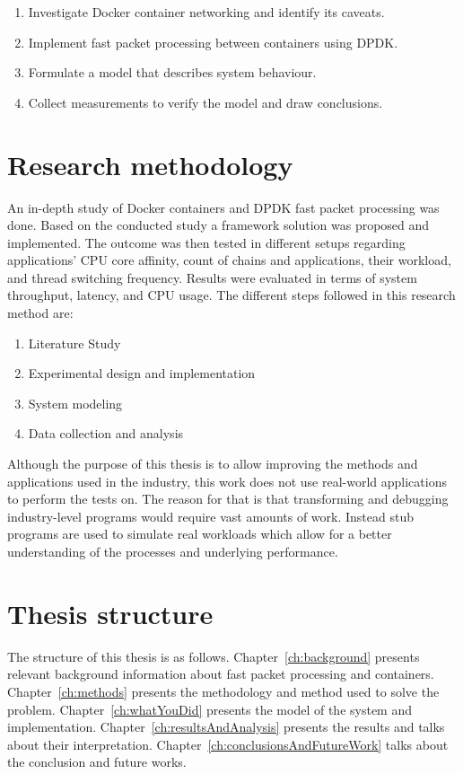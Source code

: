 \documentclass[english]{kththesis}
\begin{document}
\begin{enumerate}
\item Investigate Docker container networking and identify its caveats.
\item Implement fast packet processing between containers using \gls{DPDK}.
\item Formulate a model that describes system behaviour.
\item Collect measurements to verify the model and draw conclusions.
\end{enumerate}

\section{Research methodology}
An in-depth study of Docker containers and \gls{DPDK} fast packet processing was done. Based on the conducted study a framework solution was proposed and implemented. The outcome was then tested in different setups regarding applications' CPU core affinity, count of chains and applications, their workload, and thread switching frequency. Results were evaluated in terms of system throughput, latency, and CPU usage. The different steps followed in this research method are:
\begin{enumerate}
    \item Literature Study
    \item Experimental design and implementation
    \item System modeling
    \item Data collection and analysis
\end{enumerate}

Although the purpose of this thesis is to allow improving the methods and applications used in the industry, this work does not use real-world applications to perform the tests on. The reason for that is that transforming and debugging industry-level programs would require vast amounts of work. Instead stub programs are used to simulate real workloads which allow for a better understanding of the processes and underlying performance.

\section{Thesis structure}
The structure of this thesis is as follows. Chapter~\ref{ch:background} presents relevant background information about fast packet processing and containers. Chapter~\ref{ch:methods} presents the methodology and method used to solve the problem. Chapter~\ref{ch:whatYouDid} presents the model of the system and implementation. Chapter~\ref{ch:resultsAndAnalysis} presents the results and talks about their interpretation.  Chapter~\ref{ch:conclusionsAndFutureWork} talks about the conclusion and future works.
\end{document}
